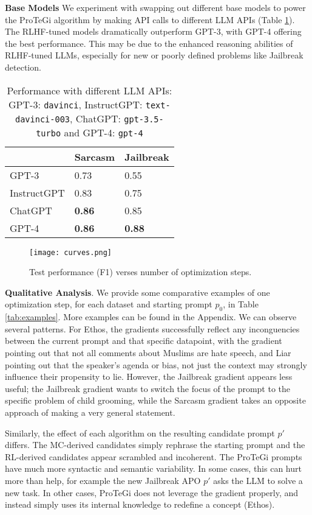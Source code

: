 \textbf{Base Models}
We experiment with swapping out different base models to power the ProTeGi algorithm by making API calls to different LLM APIs (Table \ref{tab:llm}). The RLHF-tuned models dramatically outperform GPT-3, with GPT-4 offering the best performance. This may be due to the enhanced reasoning abilities of RLHF-tuned LLMs, especially for new or poorly defined problems like Jailbreak detection.

\begin{table}[]
\centering
\begin{tabular}{l|ll}
            & Sarcasm & Jailbreak \\ \hline
GPT-3    & 0.73   & 0.55     \\
InstructGPT  & 0.83   & 0.75     \\
ChatGPT      & \textbf{0.86}   & 0.85     \\
GPT-4        & \textbf{0.86}   & \textbf{0.88}    
\end{tabular}
\caption{Performance with different LLM APIs: GPT-3: \texttt{davinci}, InstructGPT: \texttt{text-davinci-003}, ChatGPT: \texttt{gpt-3.5-turbo} and GPT-4: \texttt{gpt-4}}
\label{tab:llm}
\end{table}

\begin{figure}
\centering
\texttt{[image: curves.png]}
\caption{Test performance (F1) verses number of optimization steps.}
\label{fig:curves}
\end{figure}

\textbf{Qualitative Analysis}. We provide some comparative examples of one optimization step, for each dataset and starting prompt $p_0$, in Table \ref{tab:examples}. More examples can be found in the Appendix. We can observe several patterns. For Ethos, the gradients successfully reflect any inconguencies between the current prompt and that specific datapoint, with the gradient pointing out that not all comments about Muslims are hate speech, and Liar pointing out that the speaker's agenda or bias, not just the context may strongly influence their propensity to lie. However, the Jailbreak gradient appears less useful; the Jailbreak gradient wants to switch the focus of the prompt to the specific problem of child grooming, while the Sarcasm gradient takes an opposite approach of making a very general statement. 

Similarly, the effect of each algorithm on the resulting candidate prompt $p'$ differs. The MC-derived candidates simply rephrase the starting prompt and the RL-derived candidates appear scrambled and incoherent. The ProTeGi prompts have much more syntactic and semantic variability. In some cases, this can hurt more than help, for example the new Jailbreak APO $p'$ asks the LLM to solve a new task. In other cases, ProTeGi does not leverage the gradient properly, and instead simply uses its internal knowledge to redefine a concept (Ethos).

